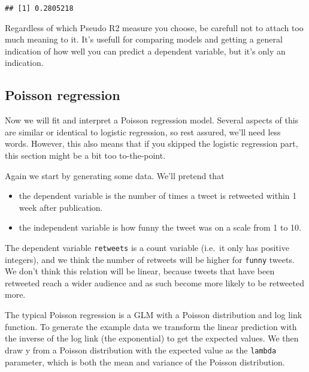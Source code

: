 \documentclass[
]{article}
\providecommand{\tightlist}{%
  \setlength{\itemsep}{0pt}\setlength{\parskip}{0pt}}
\begin{document}
\begin{verbatim}
## [1] 0.2805218
\end{verbatim}

Regardless of which Pseudo R2 measure you choose, be carefull not to
attach too much meaning to it. It's usefull for comparing models and
getting a general indication of how well you can predict a dependent
variable, but it's only an indication.

\hypertarget{poisson-regression}{%
\subsection{Poisson regression}\label{poisson-regression}}

Now we will fit and interpret a Poisson regression model. Several
aspects of this are similar or identical to logistic regression, so rest
assured, we'll need less words. However, this also means that if you
skipped the logistic regression part, this section might be a bit too
to-the-point.

Again we start by generating some data. We'll pretend that

\begin{itemize}
\tightlist
\item
  the dependent variable is the number of times a tweet is retweeted
  within 1 week after publication.
\item
  the independent variable is how funny the tweet was on a scale from 1
  to 10.
\end{itemize}

The dependent variable \texttt{retweets} is a count variable (i.e.~it
only has positive integers), and we think the number of retweets will be
higher for \texttt{funny} tweets. We don't think this relation will be
linear, because tweets that have been retweeted reach a wider audience
and as such become more likely to be retweeted more.

The typical Poisson regression is a GLM with a Poisson distribution and
log link function. To generate the example data we transform the linear
prediction with the inverse of the log link (the exponential) to get the
expected values. We then draw y from a Poisson distribution with the
expected value as the \texttt{lambda} parameter, which is both the mean
and variance of the Poisson distribution.
\end{document}
